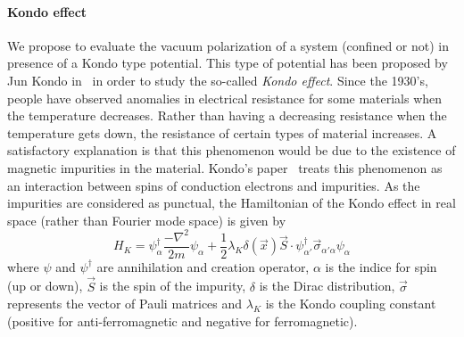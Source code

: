 \paragraph{Kondo effect}
We propose to evaluate the vacuum polarization of a system (confined or not) 
in presence of a Kondo type potential.
This type of potential has been proposed by Jun Kondo in~\cite{Kondo1964} in order to study the so-called \textit{Kondo effect}.
Since the 1930's, people have observed anomalies in electrical resistance for some materials when the temperature decreases. 
Rather than having a decreasing resistance when the temperature gets down,
the resistance of certain types of material increases. 
A satisfactory explanation is that this phenomenon would be due to the existence of magnetic impurities in the material. 
Kondo's paper~\cite{Kondo1964} treats this phenomenon as an interaction between spins of conduction electrons and impurities.
As the impurities are considered as punctual,
the Hamiltonian of the Kondo effect in real space (rather than Fourier mode space) is given by~\cite{Erdmenger2013}
\begin{equation}\label{vacuum-kondohamiltonian}
H_K = \psi_\alpha^\dagger \frac{-\nabla^2}{2m}\psi_\alpha +
\frac 1 2\lambda_K \delta(\vec{x})\vec{S}\cdot \psi_{\alpha'}^\dagger  \vec{\sigma}_{\alpha' \alpha} \psi_\alpha
\end{equation}
where $\psi$ and $\psi^\dagger$ are annihilation and creation operator, 
$\alpha$ is the indice for spin (up or down), 
$\vec{S}$ is the spin of the impurity,
$\delta$ is the Dirac distribution,
$\vec{\sigma}$ represents the vector of Pauli matrices and $\lambda_K$ is the Kondo coupling constant (positive for anti-ferromagnetic and negative for ferromagnetic).
















